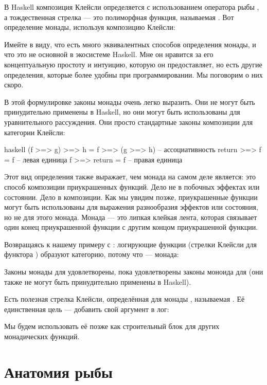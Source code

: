 В Haskell композиция Клейсли определяется с использованием оператора рыбы
\code{>=>}, а тождественная стрелка --- это
полиморфная функция, называемая . Вот определение
монады, используя композицию Клейсли:

Имейте в виду, что есть много эквивалентных способов определения монады,
и что это не основной в экосистеме Haskell. Мне он нравится
за его концептуальную простоту и интуицию, которую он предоставляет, но есть
другие определения, которые более удобны при программировании. Мы
поговорим о них скоро.

В этой формулировке законы монады очень легко выразить. Они не могут быть
принудительно применены в Haskell, но они могут быть использованы для уравнительного рассуждения. Они
просто стандартные законы композиции для категории Клейсли:

\begin{snip}{haskell}
(f >=> g) >=> h = f >=> (g >=> h) -- ассоциативность
return >=> f = f                  -- левая единица
f >=> return = f                  -- правая единица
\end{snip}
Этот вид определения также выражает, чем монада на самом деле является: это способ
композиции приукрашенных функций. Дело не в побочных эффектах или
состоянии. Дело в композиции. Как мы увидим позже, приукрашенные функции
могут быть использованы для выражения разнообразия эффектов или состояния, но не
для этого монада. Монада --- это липкая клейкая лента, которая связывает один
конец приукрашенной функции с другим концом приукрашенной
функции.

Возвращаясь к нашему примеру с : логирующие функции (стрелки
Клейсли для функтора ) образуют категорию, потому что
 --- монада:

Законы монады для  удовлетворены, пока удовлетворены законы моноида
для  (они также не могут быть принудительно применены в Haskell).

Есть полезная стрелка Клейсли, определённая для монады ,
называемая . Её единственная цель --- добавить свой аргумент в
лог:

Мы будем использовать её позже как строительный блок для других монадических функций.

\section{Анатомия рыбы}

